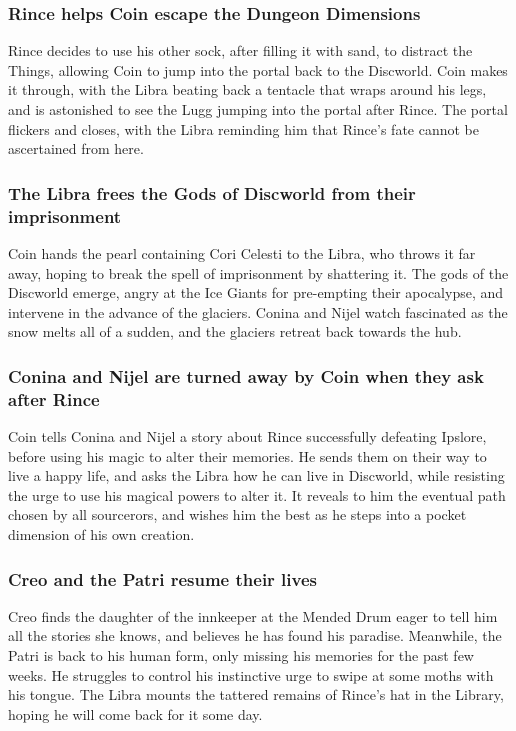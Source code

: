\subsubsection{\Gls{Rince} helps \Gls{Coin} escape the Dungeon Dimensions}
\Gls{Rince} decides to use his other sock, after filling it with sand, to distract the Things,
allowing \Gls{Coin} to jump into the portal back to the Discworld. \Gls{Coin} makes it through,
with the \Gls{Libra} beating back a tentacle that wraps around his legs, and is astonished to see
the \Gls{Lugg} jumping into the portal after \Gls{Rince}. The portal flickers and closes, with the
\Gls{Libra} reminding him that \Gls{Rince}'s fate cannot be ascertained from here.

\subsubsection{The \Gls{Libra} frees the Gods of Discworld from their imprisonment}
\Gls{Coin} hands the pearl containing Cori Celesti to the \Gls{Libra}, who throws it far away,
hoping to break the spell of imprisonment by shattering it. The gods of the Discworld emerge, angry
at the Ice Giants for pre-empting their apocalypse, and intervene in the advance of the glaciers.
\Gls{Conina} and \Gls{Nijel} watch fascinated as the snow melts all of a sudden, and the glaciers
retreat back towards the hub.

\subsubsection{\Gls{Conina} and \Gls{Nijel} are turned away by \Gls{Coin} when they ask after
    \Gls{Rince}}
\Gls{Coin} tells \Gls{Conina} and \Gls{Nijel} a story about \Gls{Rince} successfully defeating
\Gls{Ipslore}, before using his magic to alter their memories. He sends them on their way to live a
happy life, and asks the \Gls{Libra} how he can live in Discworld, while resisting the urge to use
his magical powers to alter it. It reveals to him the eventual path chosen by all sourcerors, and
wishes him the best as he steps into a pocket dimension of his own creation.

\subsubsection{\Gls{Creo} and the \Gls{Patri} resume their lives}
\Gls{Creo} finds the daughter of the innkeeper at the Mended Drum eager to tell him all the stories
she knows, and believes he has found his paradise. Meanwhile, the \Gls{Patri} is back to his human
form, only missing his memories for the past few weeks. He struggles to control his instinctive urge
to swipe at some moths with his tongue. The \Gls{Libra} mounts the tattered remains of \Gls{Rince}'s
hat in the Library, hoping he will come back for it some day.


